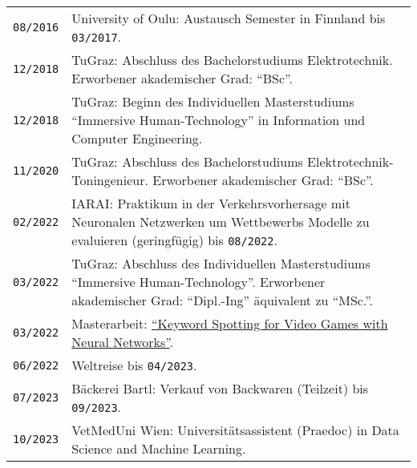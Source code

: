 {\begin{tabularx}{\columnwidth}{>{\centering\arraybackslash}p{1.5cm} | p{12cm}}
  \texttt{08/2016} & University of Oulu: Austausch Semester in Finnland bis \texttt{03/2017}.\\
  \texttt{12/2018} & TuGraz: Abschluss des Bachelorstudiums Elektrotechnik. Erworbener akademischer Grad: \enquote{BSc}.\\
  \texttt{12/2018} & TuGraz: Beginn des Individuellen Masterstudiums \enquote{Immersive Human-Technology} in Information und Computer Engineering.\\
  \texttt{11/2020} & TuGraz: Abschluss des Bachelorstudiums Elektrotechnik-Toningenieur. Erworbener akademischer Grad: \enquote{BSc}.\\
  \texttt{02/2022} & IARAI: Praktikum in der Verkehrsvorhersage mit Neuronalen Netzwerken um Wettbewerbs Modelle zu evaluieren (geringfügig) bis \texttt{08/2022}.\\
  \texttt{03/2022} & TuGraz: Abschluss des Individuellen Masterstudiums \enquote{Immersive Human-Technology}. Erworbener akademischer Grad: \enquote{Dipl.-Ing} äquivalent zu \enquote{MSc.}.\\
  \texttt{03/2022} & Masterarbeit: \href{https://github.com/chrisworld/kws_game}{\enquote{Keyword Spotting for Video Games with Neural Networks}}.\\
  \texttt{06/2022} & Weltreise bis \texttt{04/2023}.\\
  \texttt{07/2023} & Bäckerei Bartl: Verkauf von Backwaren (Teilzeit) bis \texttt{09/2023}.\\
  \texttt{10/2023} & VetMedUni Wien: Universitätsassistent (Praedoc) in Data Science and Machine Learning.\\
\end{tabularx}
}
